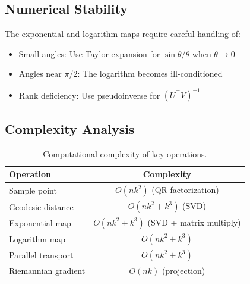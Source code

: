 \documentclass[11pt,a4paper]{article}
\begin{document}
\subsection{Numerical Stability}

The exponential and logarithm maps require careful handling of:
\begin{itemize}
    \item Small angles: Use Taylor expansion for $\sin\theta/\theta$ when $\theta \to 0$
    \item Angles near $\pi/2$: The logarithm becomes ill-conditioned
    \item Rank deficiency: Use pseudoinverse for $(U^\top V)^{-1}$
\end{itemize}

\subsection{Complexity Analysis}

\begin{table}[h]
\centering
\begin{tabular}{lc}
\toprule
\textbf{Operation} & \textbf{Complexity} \\
\midrule
Sample point & $O(nk^2)$ (QR factorization) \\
Geodesic distance & $O(nk^2 + k^3)$ (SVD) \\
Exponential map & $O(nk^2 + k^3)$ (SVD + matrix multiply) \\
Logarithm map & $O(nk^2 + k^3)$ \\
Parallel transport & $O(nk^2 + k^3)$ \\
Riemannian gradient & $O(nk)$ (projection) \\
\bottomrule
\end{tabular}
\caption{Computational complexity of key operations.}
\end{table}
\end{document}
